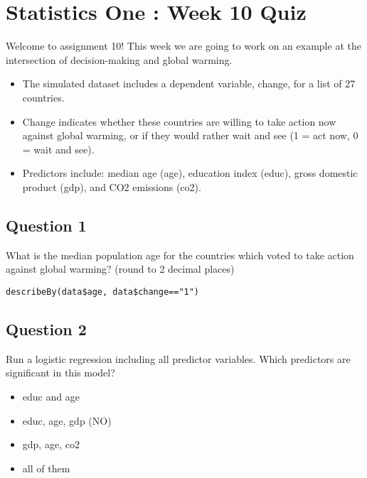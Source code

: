 \documentclass[12pt]{article}
\begin{document}
\section{Statistics One : Week 10 Quiz}

Welcome to assignment 10! This week we are going to work on an example at the intersection of decision-making and global warming. 

\begin{itemize}
\item The simulated dataset includes a dependent variable, change, for a list of 27 countries. 

\item Change indicates whether these countries are willing to take action now against global warming, or if they would rather wait and see (1 = act now, 0 = wait and see). 

\item Predictors include: median age (age), education index (educ), gross domestic product (gdp), and CO2 emissions (co2).
\end{itemize}
\subsection*{Question 1}
What is the median population age for the countries which voted to take action against global warming? (round to 2 decimal places)

\begin{framed}
\begin{verbatim}
describeBy(data$age, data$change=="1")
\end{verbatim}
\end{framed}
\subsection*{Question 2}
Run a logistic regression including all predictor variables. Which predictors are significant in this model?

\begin{itemize}
\item educ and age			
\item educ, age, gdp	(NO)	
\item gdp, age, co2			
\item all of them		
\end{itemize}	
\end{document}
